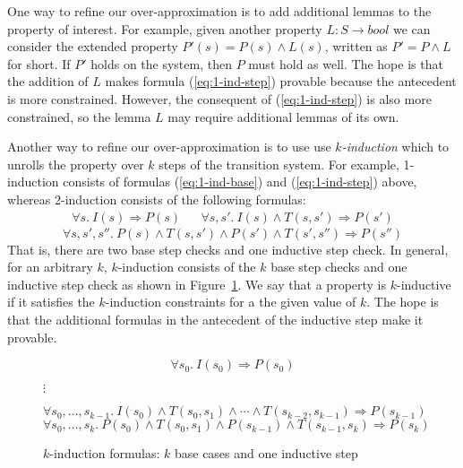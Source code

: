 One way to refine our over-approximation is to add additional lemmas
to the property of interest. For example, given another property $L :
S \to bool$ we can consider the extended property $P'(s) = P(s) \land
L(s)$, written as $P' = P \land L$ for short. If $P'$ holds on the
system, then $P$ must hold as well. The hope is that the addition of
$L$ makes formula (\ref{eq:1-ind-step}) provable because the
antecedent is more constrained. However, the consequent of
(\ref{eq:1-ind-step}) is also more constrained, so the lemma $L$ may
require additional lemmas of its own. 

Another way to refine our over-approximation is to use use {\em
  $k$-induction} which to unrolls the property over $k$ steps of the
transition system. For example, 1-induction consists of formulas
(\ref{eq:1-ind-base}) and (\ref{eq:1-ind-step}) above, whereas
2-induction consists of the following formulas:
\begin{align*}
  \forall s.~ I(s) \Rightarrow P(s)
&&  \forall s, s'.~ I(s) \land T(s, s') \Rightarrow P(s')
\end{align*}
\begin{equation*}
  \forall s, s', s''.~ P(s) \land T(s, s') \land P(s') \land T(s', s'')  \Rightarrow P(s'')
\end{equation*}
That is, there are two base step checks and one inductive step check.
In general, for an arbitrary $k$, $k$-induction consists of the $k$
base step checks and one inductive step check as shown in
Figure~\ref{fig:k-induction}. We say that a property is $k$-inductive
if it satisfies the $k$-induction constraints for a the given value of
$k$. The hope is that the additional formulas in the antecedent of
the inductive step make it provable.

\begin{figure}
\begin{equation*}
  \forall s_0.~ I(s_0) \Rightarrow P(s_0)
\end{equation*}
\begin{center}
$\vdots$
\end{center}
\begin{equation*}
  \forall s_0, \ldots, s_{k-1}.~ I(s_0) \land T(s_0, s_1) \land \cdots
  \land T(s_{k-2}, s_{k-1}) \Rightarrow P(s_{k-1})
\end{equation*}
\begin{equation*}
  \forall s_0, \ldots, s_k.~ P(s_0) \land T(s_0, s_1) \land P(s_{k-1})
  \land T(s_{k-1}, s_k) \Rightarrow P(s_k)
\end{equation*}
\caption{$k$-induction formulas: $k$ base cases and one inductive
  step}
\label{fig:k-induction}
\end{figure}

